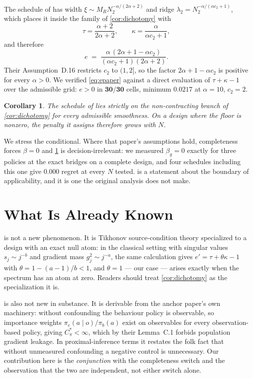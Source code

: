 \documentclass{article}
\theoremstyle{plain}
\newtheorem{corollary}[proposition]{Corollary}
\theoremstyle{definition}
\begin{document}
The schedule of \citet{hong2024} has width
$\xi \sim M_R N_2^{-\alpha/(2\alpha+2)}$ and ridge
$\lambda_2 = N_2^{-\alpha/(\alpha c_2+1)}$, which places it inside the family of
\cref{cor:dichotomy} with
\[
\tau = \frac{\alpha+2}{2\alpha+2},
\qquad
\kappa = \frac{\alpha}{\alpha c_2 + 1},
\]
and therefore
\begin{equation}
e \;=\; \frac{\alpha\,(2\alpha + 1 - \alpha c_2)}{(\alpha c_2+1)(2\alpha+2)} .
\label{eq:epaper}
\end{equation}
Their Assumption~D.16 restricts $c_2$ to $(1,2]$, so the factor
$2\alpha+1-\alpha c_2$ is positive for every $\alpha>0$. We verified
\cref{eq:epaper} against a direct evaluation of $\tau+\kappa-1$ over the
admissible grid: $e>0$ in $\mathbf{30/30}$ cells, minimum $0.0217$ at
$\alpha=10$, $c_2=2$.

\begin{corollary}
\label{cor:epaper}
The schedule of \citet{hong2024} lies strictly on the non-contracting branch of
\cref{cor:dichotomy} for every admissible smoothness. On a design where the floor
is nonzero, the penalty it assigns therefore \emph{grows} with $N$.
\end{corollary}

We stress the conditional. Where that paper's assumptions hold, completeness
forces $\beta=0$ and \cref{cor:epaper} is decision-irrelevant: we measured
$\beta_g = 0$ exactly for three policies at the exact bridges on a complete
design, and four schedules including this one give $0.000$ regret at every $N$
tested.  is a statement about the boundary of applicability, and
it is one the original analysis does not make.

\section{What Is Already Known}
\label{sec:known}
\label{sec:not-new}

 is not a new phenomenon. It is Tikhonov source-condition
theory \citep{caponnetto2007} specialized to a design with an exact null atom: in
the classical setting with singular values $s_j \sim j^{-b}$ and gradient mass
$g_j^2 \sim j^{-a}$, the same calculation gives $e' = \tau + \theta\kappa - 1$
with $\theta = 1 - (a-1)/b < 1$, and $\theta=1$ --- our case --- arises exactly
when the spectrum has an atom at zero. Readers should treat
\cref{cor:dichotomy} as the specialization it is.

 is also not new in substance. It is derivable from the anchor
paper's own machinery: without confounding the behaviour policy is observable, so
importance weights $\pi_e(a\mid o)/\pi_b(a)$ exist on observables for every
observation-based policy, giving $C^*_\pi < \infty$, which by their Lemma~C.1
forbids population gradient leakage. In proximal-inference terms it restates the
folk fact that without unmeasured confounding a negative control is unnecessary.
Our contribution here is the \emph{conjunction} with the completeness switch and
the observation that the two are independent, not either switch alone.
\end{document}
